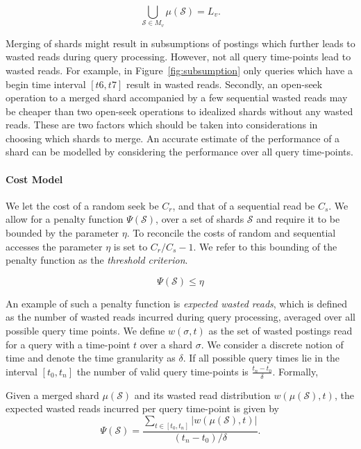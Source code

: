 $$
	\bigcup_{\mathcal{S} \in M_v}{\mu(\mathcal{S})} = L_v.
$$

Merging of shards might result in subsumptions of postings which further leads to wasted reads during query processing. However, not all query time-points lead to wasted reads. For example, in Figure~\ref{fig:subsumption} only queries which have a begin time interval $[t6, t7]$ result in wasted reads. Secondly, an open-seek operation to a merged shard accompanied by a few
sequential wasted reads may be cheaper than two open-seek operations to
idealized shards without any wasted reads. These are two factors which should be taken into considerations in choosing which shards to merge. An accurate estimate of the performance of a shard can be modelled by considering the performance over all query time-points.

\paragraph{Cost Model} We let the cost of a random seek be $C_r$, and that of a sequential read be $C_s$. 
We allow for a penalty function $\Psi(\mathcal{S})$, over a set of shards $\mathcal{S}$ and require it to be bounded by the parameter $\eta$. To reconcile the costs of random and sequential accesses the parameter $\eta$ is set to $C_r/C_s - 1$. We refer to this bounding of the penalty function as the \emph{threshold criterion}.

$$\Psi(\mathcal{S}) \leq \eta$$

An example of such a penalty function is \emph{expected wasted reads},
which is defined as the number of wasted reads incurred during query
processing, averaged over all possible query time points. 
We define $w(\sigma, t)$ as the set of wasted postings read for a query with a time-point $t$ over a shard $\sigma$. We consider a discrete notion of time and denote the time granularity as $\delta$. If all possible query times lie in the interval $[t_{0}, t_{n}]$ the number of valid query time-points is $\frac{t_{n} - t_{0}}{\delta}$. Formally, 

\begin{definition}
	Given a merged shard $\mu(\mathcal{S})$ and its wasted read distribution $w(\mu(\mathcal{S}), t)$, the expected wasted reads incurred per query time-point is given by
		$$
			\Psi(\mathcal{S}) = \frac{\sum_{t \in [t_{0}, t_{n}]}{\left|w(\mu(\mathcal{S}), t)\right|}}{(t_{n} - t_{0})/ \delta}.
		$$
\end{definition}

